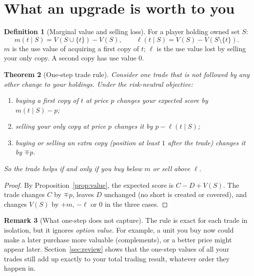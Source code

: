 \documentclass[11pt]{article}
\newtheorem{theorem}{Theorem}
\theoremstyle{definition}
\newtheorem{definition}[theorem]{Definition}
\newtheorem{remark}[theorem]{Remark}
\begin{document}
\begin{table}[ht]\centering\small
\TableTriples
\caption{Best and worst pair for each owned set of three types (expected payout in brackets). ED Extra Die, SC Second Chance, LD Loaded Dice, SH Six Hunter, JP Jackpot, SN Safety Net.}\label{tab:triples}
\end{table}

\section{What an upgrade is worth to you}

\begin{definition}[Marginal value and selling loss]
For a player holding owned set $S$:
\[
  m(t \mid S) = V(S \cup \{t\}) - V(S), \qquad \ell(t \mid S) = V(S) - V(S \setminus \{t\}).
\]
$m$ is the use value of acquiring a first copy of $t$; $\ell$ is the use value lost by selling your only copy. A second copy has use value $0$.
\end{definition}

\begin{theorem}[One-step trade rule]\label{thm:trade}
Consider one trade that is not followed by any other change to your holdings. Under the risk-neutral objective:
\begin{enumerate}
\item buying a first copy of $t$ at price $p$ changes your expected score by $m(t\mid S) - p$;
\item selling your only copy at price $p$ changes it by $p - \ell(t\mid S)$;
\item buying or selling an extra copy (position at least $1$ after the trade) changes it by $\mp p$.
\end{enumerate}
So the trade helps if and only if you buy below $m$ or sell above $\ell$.
\end{theorem}
\begin{proof}
By Proposition~\ref{prop:value}, the expected score is $C - D + V(S)$. The trade changes $C$ by $\mp p$, leaves $D$ unchanged (no short is created or covered), and changes $V(S)$ by $+m$, $-\ell$ or $0$ in the three cases.
\end{proof}

\begin{remark}[What one-step does not capture]
The rule is exact for each trade in isolation, but it ignores \emph{option value}. For example, a unit you buy now could make a later purchase more valuable (complements), or a better price might appear later. Section~\ref{sec:review} shows that the one-step values of all your trades still add up exactly to your total trading result, whatever order they happen in.
\end{remark}
\end{document}
